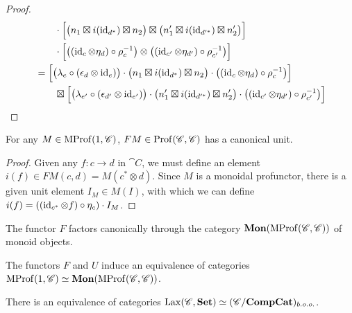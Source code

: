 \documentclass[12pt,oneside,article,draft]{memoir}
\begin{document}
\begin{proof}
\begin{align*}
		&\qquad \cdot\Bigl[\bigl(n_1\boxtimes i(\operatorname{id}_{d^*})\boxtimes n_2\bigr)\boxtimes\bigl(n'_1\boxtimes i(\operatorname{id}_{d'^*})\boxtimes n'_2\bigr)\Bigr] \\
		&\qquad \cdot\Bigl[\bigl((\operatorname{id}_c\otimes\eta_d)\circ\rho_c^{-1}\bigr)\otimes\bigl((\operatorname{id}_{c'}\otimes\eta_{d'})\circ\rho_{c'}^{-1}\bigr)\Bigr] \\
		&= \Bigl[\bigl(\lambda_e\circ(\epsilon_d\otimes\operatorname{id}_e)\bigr)\cdot\bigl(n_1\boxtimes i(\operatorname{id}_{d^*})\boxtimes n_2\bigr)\cdot\bigl((\operatorname{id}_c\otimes\eta_d)\circ\rho_c^{-1}\bigr)\Bigr] \\
		&\qquad \boxtimes\Bigl[\bigl(\lambda_{e'}\circ(\epsilon_{d'}\otimes\operatorname{id}_{e'})\bigr)\cdot\bigl(n'_1\boxtimes i(\operatorname{id}_{d'^*})\boxtimes n'_2\bigr)\cdot\bigl((\operatorname{id}_{c'}\otimes\eta_{d'})\circ\rho_{c'}^{-1}\bigr)\Bigr]
	\end{align*}
\end{proof}

\begin{proposition}
	For any $M\in\operatorname{MProf}(1,\mathscr{C})$, $FM\in\operatorname{Prof}(\mathscr{C},\mathscr{C})$ has a canonical unit.
\end{proposition}
\begin{proof}
	Given any $f\colon c\to d$ in $\cat{C}$, we must define an element $i(f)\in FM(c,d)=M(c^*\otimes d)$. Since $M$ is a monoidal profunctor, there is a given unit element $I_M\in M(I)$, with which we can define $i(f)=((\operatorname{id}_{c^*}\otimes f)\circ\eta_c)\cdot I_M$.
\end{proof}

\begin{corollary}
	The functor $F$ factors canonically through the category $\mathbf{Mon}(\operatorname{MProf}(\mathscr{C},\mathscr{C}))$ of monoid objects.
\end{corollary}

\begin{proposition}
	The functors $F$ and $U$ induce an equivalence of categories $\operatorname{MProf}(1,\mathscr{C})\simeq\mathbf{Mon}(\operatorname{MProf}(\mathscr{C},\mathscr{C}))$.
\end{proposition}

\begin{corollary}
	There is an equivalence of categories $\operatorname{Lax}(\mathscr{C},\mathbf{Set})\simeq(\mathscr{C}/\mathbf{CompCat})_{b.o.o.}$.
\end{corollary}
\end{document}
